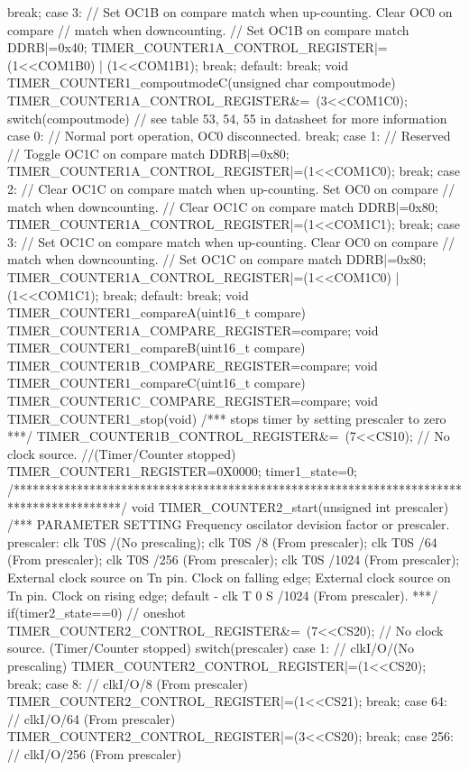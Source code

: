 \begin{verbatimtab}
{{		break;
		case 3: // Set OC1B on compare match when up-counting. Clear OC0 on compare
		// match when downcounting.
		// Set OC1B on compare match
		DDRB|=0x40;
		TIMER_COUNTER1A_CONTROL_REGISTER|=(1<<COM1B0) | (1<<COM1B1);
		break;
		default:
		break;
	}
}
void TIMER_COUNTER1_compoutmodeC(unsigned char compoutmode)
{
	TIMER_COUNTER1A_CONTROL_REGISTER&=~(3<<COM1C0);
	switch(compoutmode){ // see table 53, 54, 55 in datasheet for more information
		case 0: // Normal port operation, OC0 disconnected.
		break;
		case 1: // Reserved
		// Toggle OC1C on compare match
		DDRB|=0x80;
		TIMER_COUNTER1A_CONTROL_REGISTER|=(1<<COM1C0);
		break;
		case 2: // Clear OC1C on compare match when up-counting. Set OC0 on compare
		// match when downcounting.
		// Clear OC1C on compare match
		DDRB|=0x80;
		TIMER_COUNTER1A_CONTROL_REGISTER|=(1<<COM1C1);
		break;
		case 3: // Set OC1C on compare match when up-counting. Clear OC0 on compare
		// match when downcounting.
		// Set OC1C on compare match
		DDRB|=0x80;
		TIMER_COUNTER1A_CONTROL_REGISTER|=(1<<COM1C0) | (1<<COM1C1);
		break;
		default:
		break;
	}
}
void TIMER_COUNTER1_compareA(uint16_t compare)
{
	TIMER_COUNTER1A_COMPARE_REGISTER=compare;
}
void TIMER_COUNTER1_compareB(uint16_t compare)
{
	TIMER_COUNTER1B_COMPARE_REGISTER=compare;
}
void TIMER_COUNTER1_compareC(uint16_t compare)
{
	TIMER_COUNTER1C_COMPARE_REGISTER=compare;
}
void TIMER_COUNTER1_stop(void)
/***
stops timer by setting prescaler to zero
***/
{
	TIMER_COUNTER1B_CONTROL_REGISTER&=~(7<<CS10); // No clock source.
	//(Timer/Counter stopped)
	TIMER_COUNTER1_REGISTER=0X0000;
	timer1_state=0;
}
/*****************************************************************************************/
void TIMER_COUNTER2_start(unsigned int prescaler)
/***
PARAMETER SETTING
Frequency oscilator devision factor or prescaler.
prescaler: clk T0S /(No prescaling); clk T0S /8 (From prescaler);
clk T0S /64 (From prescaler);
clk T0S /256 (From prescaler); clk T0S /1024 (From prescaler);
External clock source on Tn pin. Clock on falling edge;
External clock source on Tn pin. Clock on rising edge;
default - clk T 0 S /1024 (From prescaler).
***/
{
	if(timer2_state==0){ // oneshot
		TIMER_COUNTER2_CONTROL_REGISTER&=~(7<<CS20); // No clock source. (Timer/Counter stopped)
		switch(prescaler){
			case 1: // clkI/O/(No prescaling)
			TIMER_COUNTER2_CONTROL_REGISTER|=(1<<CS20);
			break;
			case 8: // clkI/O/8 (From prescaler)
			TIMER_COUNTER2_CONTROL_REGISTER|=(1<<CS21);
			break;
			case 64: // clkI/O/64 (From prescaler)
			TIMER_COUNTER2_CONTROL_REGISTER|=(3<<CS20);
			break;
			case 256: // clkI/O/256 (From prescaler)
}}}
\end{verbatimtab}
